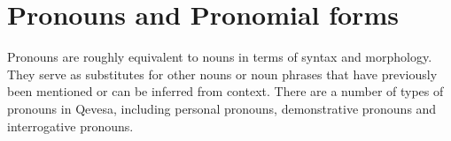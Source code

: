\documentclass[grammar]{subfiles}
\begin{document}
% 
% 
% 
% 
% 
% 
% 
% 
% 
% 
% 
% 
% 
% 
% 
% 
% 
% 



\section{Pronouns and Pronomial forms}
\label{sec:nm_pronouns}

Pronouns are roughly equivalent to nouns in terms of syntax and morphology.
They serve as substitutes for other nouns or noun phrases that have
previously been mentioned or can be inferred from context.  There are a
number of types of pronouns in Qevesa, including personal pronouns,
demonstrative pronouns and interrogative pronouns.
\end{document}
